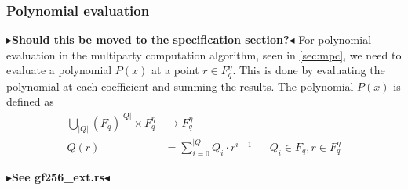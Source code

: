 \documentclass[twoside,11pt]{report}
\theoremstyle{definition}
\theoremstyle{plain}
\newcommand{\todo}[1]{{\color[rgb]{.5,0,0}\textbf{$\blacktriangleright$#1$\blacktriangleleft$}}}
\begin{document}
\subsubsection{Polynomial evaluation}
\todo{Should this be moved to the specification section?}
For polynomial evaluation in the multiparty computation algorithm, seen in \autoref{sec:mpc}, we need to evaluate a polynomial $P(x)$ at a point $r \in F_q^\eta$. This is done by evaluating the polynomial at each coefficient and summing the results. The polynomial $P(x)$ is defined as
\begin{align}
  \textstyle\bigcup_{|Q|}(F_q)^{|Q|} \times F_q^\eta & \rightarrow F_q^\eta                 \nonumber                                                    \\
  Q(r)                                               & = \textstyle\sum_{i=0}^{|Q|} Q_i \cdot r^{i-1} &  & Q_i \in F_q, r \in F_q^\eta\label{eq:mpcpoly}
\end{align}

\todo{See gf256\_ext.rs}
\end{document}

